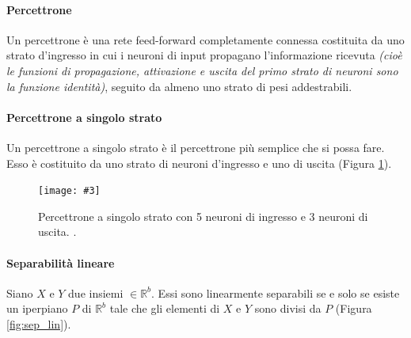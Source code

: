 \documentclass[12pt, twoside, letterpaper]{report}
\newcommand{\img}[4] {
	\begin{figure}
		\centering
		\texttt{[image: \#3]}\\
		\caption{#1}
		\label{fig:#4}
	\end{figure}
}
\begin{document}
			\paragraph{Percettrone} Un percettrone è una rete feed-forward completamente connessa costituita da uno strato d'ingresso in cui i neuroni di input propagano l'informazione ricevuta \textit{(cioè le funzioni di propagazione, attivazione e uscita del primo strato di neuroni sono la funzione identità)}, seguito da almeno uno strato di pesi addestrabili.
			
			\paragraph{Percettrone a singolo strato} Un percettrone a singolo strato è il percettrone più semplice che si possa fare. Esso è costituito da uno strato di neuroni d'ingresso e uno di uscita (Figura \ref{fig:slp}). 
				\img{Percettrone a singolo strato con 5 neuroni di ingresso e 3 neuroni di uscita. \cite{kriesel}.}{0.5}{slp.png}{slp} 
				
			\paragraph{Separabilità lineare} Siano $X$ e $Y$ due insiemi $\in \mathbb{R}^b$. Essi sono linearmente separabili se e solo se esiste un iperpiano $P$ di $\mathbb{R}^b$ tale che gli elementi di $X$ e $Y$ sono divisi da $P$ (Figura \ref{fig:sep_lin}). 
			
\end{document}
